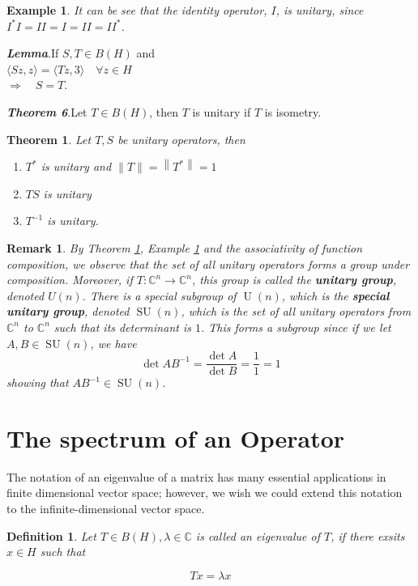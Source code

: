 \documentclass{report}
\newtheorem{thm}{Theorem}
\newtheorem{defn}{Definition}
\newtheorem{exm}{Example}
\newtheorem{rem}{Remark}
\begin{document}
\begin{exm} \label{IdIsUnitary}
  It can be see that the identity operator, $I$, is unitary, since $I^{*}I=II=I=II=II^{*}$.
\end{exm}

\textbf{\textit{Lemma}}.If $S, T \in B (H)$ and\\
$\langle S z, z\rangle=\langle T z, 3\rangle \quad \forall z \in H$\\
$\Rightarrow \quad S=T$.

\textbf{\textit{Theorem 6}}.Let $T \in B(H)$, then $T$ is unitary if $T$ is isometry.

\begin{thm} \label{UnitaryProp}
Let $T, S$ be unitary operators, then
\begin{enumerate}
  \item $T^{*}$ is unitary and $\|T\|=\left\|T^{*}\right\|=1$
  \item $T S$ is unitary
  \item $T^{-1}$ is unitary.
\end{enumerate}
\end{thm}

\begin{rem}
  By Theorem \ref{UnitaryProp}, Example \ref{IdIsUnitary} and the associativity of function composition, we observe that the set of all unitary operators forms a group under composition. Moreover, if $T:\mathbb{C}^{n}\to\mathbb{C}^{n}$, this group is called the \textbf{unitary group}, denoted $U(n)$. There is a special subgroup of $\operatorname{U}(n)$, which is the \textbf{special unitary group}, denoted $\operatorname{SU}(n)$, which is the set of all unitary operators from $\mathbb{C}^{n}$ to $\mathbb{C}^{n}$ such that its determinant is $1$. This forms a subgroup since if we let $A,B\in\operatorname{SU}(n)$, we have
  $$
  \operatorname{det}AB^{-1} = \frac{\operatorname{det}A}{\operatorname{det}B} = \frac{1}{1} = 1
  $$
  showing that $AB^{-1}\in\operatorname{SU}(n)$.
\end{rem}

\section{The spectrum of an Operator}
The notation of an eigenvalue of a matrix has many essential applications in finite dimensional vector space; however, we wish we could extend this notation to the infinite-dimensional vector space.

\begin{defn}
Let $T \in B(H), \lambda \in \mathbb{C}$ is called an eigenvalue of $T$, if there exsits $x \in H$ such that

$$
Tx=\lambda x
$$
\end{defn}
\end{document}

